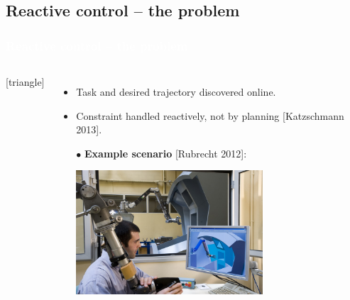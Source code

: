 \subsection{Reactive control -- the problem}
\begin{frame}
\frametitle{{\textcolor{white}{\hspace{0.3cm}Reactive control -- the problem}}}

\begin{columns}

\column{.98\paperwidth}
[triangle]                        
\begin{itemize}
\item {\color{red}Task and desired trajectory discovered online.}
\item {\color{red}Constraint handled reactively, not by planning} [Katzschmann 2013].
\setlength\itemsep{1em}
\item[$\bullet$] \textbf{Example scenario} [Rubrecht 2012]:

\vspace{1mm}
\begin{center}
\includegraphics[width=0.65\textwidth]{figures/rubrecht_imaj.png}
\end{center}
\end{itemize}
\end{columns}
\end{frame}









